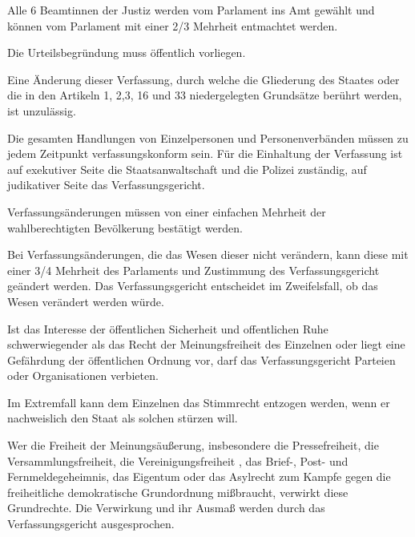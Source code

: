\documentclass{sasbase}
\begin{document}
\begin{article}
	\item Alle 6 Beamtinnen der Justiz werden vom Parlament ins Amt gewählt und können vom Parlament mit einer 2/3 Mehrheit entmachtet werden.
	\item Die Urteilsbegründung muss öffentlich vorliegen.
\end{article}


\begin{article}[Ewigkeitsklausel]
	\item Eine Änderung dieser Verfassung, durch welche die Gliederung des Staates oder die in den Artikeln 1, 2,3, 16 und 33 niedergelegten Grundsätze berührt werden, ist unzulässig.
\end{article}

\begin{article}
	\item Die gesamten Handlungen von Einzelpersonen und Personenverbänden müssen zu jedem Zeitpunkt verfassungskonform sein. Für die Einhaltung der Verfassung ist auf exekutiver Seite die Staatsanwaltschaft und die Polizei zuständig, auf judikativer Seite das Verfassungsgericht.
	\item Verfassungsänderungen müssen von einer einfachen Mehrheit der wahlberechtigten Bevölkerung bestätigt werden.
	\item Bei Verfassungsänderungen, die das Wesen dieser nicht verändern, kann diese mit einer 3/4 Mehrheit des Parlaments und Zustimmung des Verfassungsgericht geändert werden. Das Verfassungsgericht entscheidet im Zweifelsfall, ob das Wesen verändert werden würde.
\end{article}

\begin{article}
	\item Ist das Interesse der öffentlichen Sicherheit und offentlichen Ruhe schwerwiegender als das Recht der Meinungsfreiheit des Einzelnen oder liegt eine Gefährdung der öffentlichen Ordnung vor, darf das Verfassungsgericht Parteien oder Organisationen verbieten.
	\item Im Extremfall kann dem Einzelnen das Stimmrecht entzogen werden, wenn er nachweislich den Staat als solchen stürzen will.
	\item Wer die Freiheit der Meinungsäußerung, insbesondere die Pressefreiheit, die Versammlungsfreiheit, die Vereinigungsfreiheit , das Brief-, Post- und Fernmeldegeheimnis, das Eigentum oder das Asylrecht zum Kampfe gegen die freiheitliche demokratische Grundordnung mißbraucht, verwirkt diese Grundrechte. Die Verwirkung und ihr Ausmaß werden durch das Verfassungsgericht ausgesprochen.
\end{article}
\newpage
\end{document}
